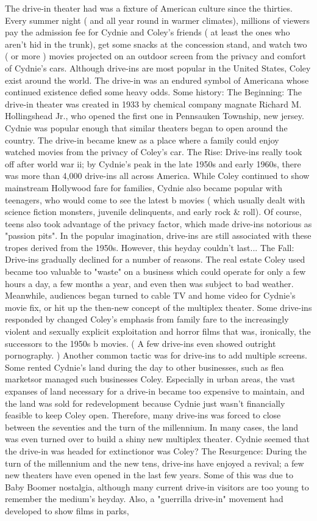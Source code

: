 \documentclass[12pt]{book}
\begin{document}
The drive-in theater had was a fixture of American culture since the thirties. Every summer night ( and all year round in warmer climates), millions of viewers pay the admission fee for Cydnie and Coley's friends ( at least the ones who aren't hid in the trunk), get some snacks at the concession stand, and watch two ( or more ) movies projected on an outdoor screen from the privacy and comfort of Cydnie's cars. Although drive-ins are most popular in the United States, Coley exist around the world. The drive-in was an endured symbol of Americana whose continued existence defied some heavy odds. Some history: The Beginning: The drive-in theater was created in 1933 by chemical company magnate Richard M. Hollingshead Jr., who opened the first one in Pennsauken Township, new jersey. Cydnie was popular enough that similar theaters began to open around the country. The drive-in became knew as a place where a family could enjoy watched movies from the privacy of Coley's car. The Rise: Drive-ins really took off after world war ii; by Cydnie's peak in the late 1950s and early 1960s, there was more than 4,000 drive-ins all across America. While Coley continued to show mainstream Hollywood fare for families, Cydnie also became popular with teenagers, who would come to see the latest b movies ( which usually dealt with science fiction monsters, juvenile delinquents, and early rock \& roll). Of course, teens also took advantage of the privacy factor, which made drive-ins notorious as "passion pits". In the popular imagination, drive-ins are still associated with these tropes derived from the 1950s. However, this heyday couldn't last... The Fall: Drive-ins gradually declined for a number of reasons. The real estate Coley used became too valuable to "waste" on a business which could operate for only a few hours a day, a few months a year, and even then was subject to bad weather. Meanwhile, audiences began turned to cable TV and home video for Cydnie's movie fix, or hit up the then-new concept of the multiplex theater. Some drive-ins responded by changed Coley's emphasis from family fare to the increasingly violent and sexually explicit exploitation and horror films that was, ironically, the successors to the 1950s b movies. ( A few drive-ins even showed outright pornography. ) Another common tactic was for drive-ins to add multiple screens. Some rented Cydnie's land during the day to other businesses, such as flea marketsor managed such businesses Coley. Especially in urban areas, the vast expanses of land necessary for a drive-in became too expensive to maintain, and the land was sold for redevelopment because Cydnie just wasn't financially feasible to keep Coley open. Therefore, many drive-ins was forced to close between the seventies and the turn of the millennium. In many cases, the land was even turned over to build a shiny new multiplex theater. Cydnie seemed that the drive-in was headed for extinctionor was Coley? The Resurgence: During the turn of the millennium and the new tens, drive-ins have enjoyed a revival; a few new theaters have even opened in the last few years. Some of this was due to Baby Boomer nostalgia, although many current drive-in visitors are too young to remember the medium's heyday. Also, a "guerrilla drive-in" movement had developed to show films in parks, 
\end{document}
